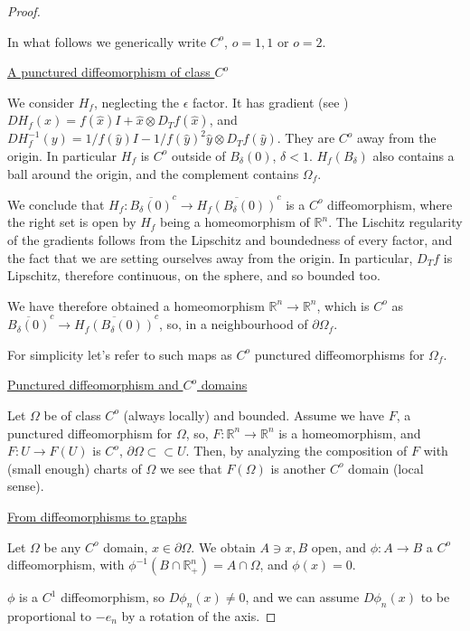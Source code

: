 \documentclass[english,a4paper,9pt,oneside]{scrbook}	%
\theoremstyle{break}
\newenvironment{mproof}[1][\proofname]{%
  \begin{proof}[#1]$ $\par\nobreak\ignorespaces
}{%
  \end{proof}
}
\renewcommand*{\proofname}{Proof}
\theoremstyle{remark}
\newcommand{\mR}{\mathbb{R}}
\newcommand{\cc}{\subset\subset}
\newcommand{\xh}{\hat{x}}
\newcommand{\yh}{\hat{y}}
\newcommand{\eps}{\epsilon}
\begin{document}
\begin{mproof}

In what follows we generically write $ C^o$, $o=1,1 $ or $o=2$.


\underline{A punctured diffeomorphism of class $C^o$}

We consider $H_f$, neglecting the $\eps$ factor. It has gradient (see \cite{deckelnick}) $D H_f(x) = f(\xh)I+\xh \otimes D_Tf(\xh)$, and  $D H_f^{-1}(y) =1/f(\yh)I-1/f(\yh)^2 \yh \otimes D_Tf(\yh)$. They are $C^o$ away from the origin. In particular $H_f$ is $C^o$  outside of $B_\delta(0)$, $\delta < 1$. $H_f(B_\delta)$ also contains a ball around the origin, and the complement contains $\Omega_f$.

We conclude that $H_f: \overline{B_\delta(0)}^c \rightarrow \overline{H_f(B_\delta(0))}^c$ is a $C^o$ diffeomorphism, where the right set is open by $H_f$ being a homeomorphism of $\mR^n$. The Lischitz regularity of the gradients follows from the Lipschitz and boundedness of every factor, and the fact that we are setting ourselves away from the origin. In particular, $D_T f$ is Lipschitz, therefore continuous, on the sphere, and so bounded too.

We have therefore obtained a homeomorphism $\mR^n \rightarrow \mR^n$, which is $C^o$ as $\overline{B_\delta(0)}^c \rightarrow \overline{H_f(B_\delta(0))}^c$, so, in a neighbourhood of $\partial \Omega_f$.

For simplicity let's refer to such maps as $C^o$ punctured diffeomorphisms for $\Omega_f$.

\underline{Punctured diffeomorphism and $C^o$ domains}

Let $\Omega$ be of class $C^o$ (always locally) and bounded. Assume we have $F$, a punctured diffeomorphism for $\Omega$, so, $F:\mR^n\rightarrow \mR^n$ is a homeomorphism, and $F: U\rightarrow F(U)$ is $C^o$, $\partial \Omega \cc U$. Then, by analyzing the composition of $F$ with (small enough) charts of $\Omega$ we see that $F(\Omega)$ is another $C^o$ domain (local sense). 

\underline{From diffeomorphisms to graphs}

Let $\Omega$ be any $C^o$ domain, $x\in \partial \Omega$. We obtain $A\ni x, B$ open, and $\phi: A\rightarrow B$ a $C^o$ diffeomorphism, with $\phi^{-1}(B\cap \mR^n_+)=A\cap \Omega$, and $\phi(x)=0$.

$\phi$ is a $C^1$ diffeomorphism, so $D\phi_n(x)\neq 0$, and we can assume $D\phi_n(x)$ to be proportional to $-e_n$ by a rotation of the axis.


\end{mproof}
\end{document}
